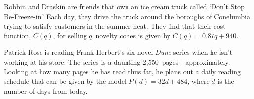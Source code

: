 \documentclass[12pt,letterpaper]{exam}
\begin{document}
\begin{questions}



\newpage
\question Robbin and Draskin are friends that own an ice cream truck called `Don’t Stop Be-Freeze-in.' Each day, they drive the truck around the boroughs of Conelumbia trying to satisfy customers in the summer heat. They find that their cost function, $C(q)$, for selling $q$~novelty cones is given by $C(q)= 0.87q + 940$. 



\newpage
\question Patrick Rose is reading Frank Herbert's six novel \textit{Dune} series when he isn't working at his store. The series is a daunting 2,550~pages---approximately. Looking at how many pages he has read thus far, he plans out a daily reading schedule that can be given by the model $P(d)= 32d + 484$, where $d$ is the number of days from today. 




\end{questions}
\end{document}
